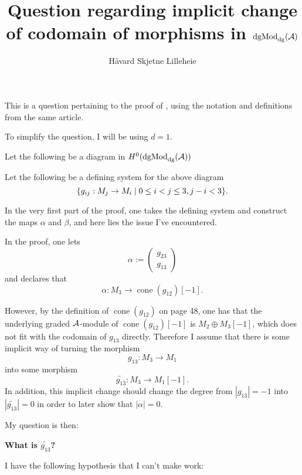 \documentclass[a4paper, 12pt]{article}
\title{Question regarding implicit change of codomain of morphisms in \( \operatorname{dgMod}_{\operatorname{dg}}({\mathcal{A}}) \)}
\author{Håvard Skjetne Lilleheie}
\DeclareMathOperator{\cone}{cone}
\begin{document}
\maketitle

This is a question pertaining to the proof of \cite[Proposition 4.2.8]{Jasso--Muro_2023_arXiv}, using the notation and definitions from the same article.

To simplify the question, I will be using \( d = 1 \).

Let the following be a diagram in \( H^0(\operatorname{dgMod}_{\operatorname{dg}}({\mathcal{A}})) \)
\begin{center}
\end{center}

Let the following be a defining system for the above diagram
\[
    \{g_{ij}: M_j \to M_i \mid 0 \leq i < j \leq 3, j - i < 3\}.
\]

In the very first part of the proof, one takes the defining system and construct the maps \( \alpha \) and \( \beta \), and here lies the issue I've encountered.

In the proof, one lets
\[
    \alpha :=
    \begin{pmatrix}
        g_{23} \\
        g_{13}
    \end{pmatrix}
\]
and declares that
\[
    \alpha: M_3 \to \cone(g_{12})[-1].
\]

However, by the definition of \( \cone(g_{12}) \) on page 48, one has that the underlying graded \( {\mathcal{A}} \)-module of \( \cone(g_{12})[-1] \) is \( M_2 \oplus M_3[-1] \), which does not fit with the codomain of \( g_{13} \) directly. Therefore I assume that there is some implicit way of turning the morphism
\[
    g_{13}: M_3 \to M_1
\]
into some morphism
\[
    \widetilde{g_{13}}: M_3 \to M_1[-1].
\]
In addition, this implicit change should change the degree from \( |g_{13}| = -1 \) into \( |\widetilde{g_{13}}| = 0 \) in order to later show that \( |\alpha| = 0 \).

My question is then:
\begin{center}
    \textbf{What is \( \widetilde{g_{13}} \)?}
\end{center}
I have the following hypothesis that I can't make work:
\end{document}
